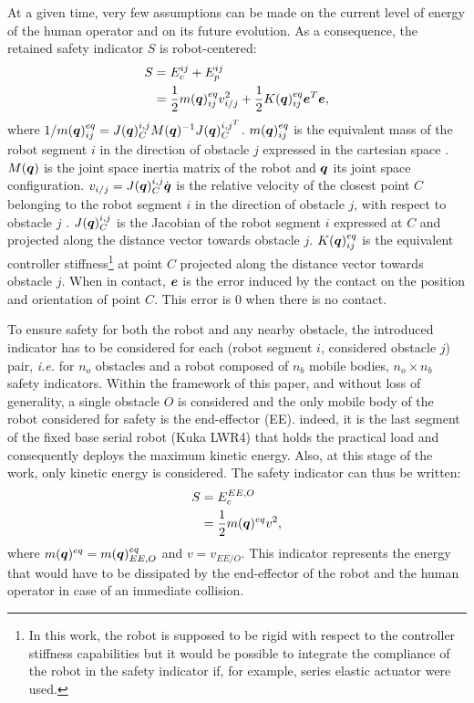 \documentclass[a4paper, 10pt, conference]{ieeeconf}      %
\newcommand{\vect}[1]{\mbox{\boldmath${#1}$}}%
\begin{document}
At a given time, very few assumptions can be made on the current level of energy of the human operator and on its future evolution. As a consequence, the retained safety indicator $S$ is robot-centered:
\begin{equation}
\begin{split}
 S &= E_c^{ij} + E_p^{ij} 
 \\
             &= \frac{1}{2}  m(\vect{q})_{ij}^{eq} v_{i/j}^2 + \frac{1}{2} K(\vect{q})_{ij}^{eq} \vect{e}^T \vect{e},
\end{split} 
\end{equation}
where $1/m(\vect{q})_{ij}^{eq}  = J(\vect{q})_{C}^{i,j} M(\vect{q})^{-1} J(\vect{q})_{C}^{{i,j}^T}$. $m(\vect{q})_{ij}^{eq}$ is the equivalent mass of the robot segment $i$ in the direction of obstacle $j$ expressed in the cartesian space \cite{khatib1995inertial}. $M(\vect{q})$ is the joint space inertia matrix of the robot and $\vect{q}$ its joint space configuration. $v_{i/j} = J(\vect{q})_{C}^{i,j} \dot{\vect{q}}$ is the relative velocity of the closest point $C$ belonging to the robot segment $i$ in the direction of obstacle $j$, with respect to obstacle $j$ . $J(\vect{q})_{C}^{i,j}$ is the Jacobian of the robot segment $i$ expressed at $C$ and projected along the distance vector towards obstacle $j$. $K(\vect{q})_{ij}^{eq}$ is the equivalent controller stiffness\footnote{In this work, the robot is supposed to be rigid with respect to the controller stiffness capabilities but it would be possible to integrate the compliance of the robot in the safety indicator if, for example, series elastic actuator were used.} at point $C$ projected along the distance vector towards obstacle $j$. When in contact, $\vect{e}$ is the error induced by the contact on the position and orientation of point $C$. This error is $0$ when there is no contact. 

To ensure safety for both the robot and any nearby obstacle, the introduced indicator has to be considered for each (robot segment $i$, considered obstacle $j$) pair, \textit{i.e.} for $n_o$ obstacles and a robot composed of $n_b$ mobile bodies, $n_o \times n_b$ safety indicators. Within the framework of this paper, and without loss of generality, a single obstacle $O$ is considered and the only mobile body of the robot considered for safety is the end-effector (EE). indeed, it is the last segment of the fixed base serial robot (Kuka LWR4) that holds the practical load and consequently deploys the maximum kinetic energy. Also, at this stage of the work, only kinetic energy is considered. The safety indicator can thus be written: 
\begin{equation}
\begin{split}
S &= E_c^{EE,O} \\
 &= \frac{1}{2} m(\vect{q})^{eq} v^2,
\end{split}
\end{equation}
where $m(\vect{q})^{eq} = m(\vect{q})_{EE,O}^{eq}$ and $v = v_{EE/O}$. This indicator represents the energy that would have to be dissipated by the end-effector of the robot and the human operator in case of an immediate collision.
\end{document}
